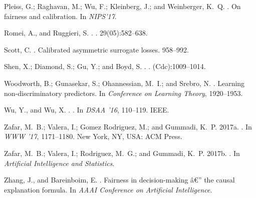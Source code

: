 \documentclass[letterpaper]{article} %
\begin{document}
\begin{thebibliography}{}
Pleiss, G.; Raghavan, M.; Wu, F.; Kleinberg, J.; and Weinberger, K.~Q.
.
\newblock On fairness and calibration.
\newblock In {\em NIPS'17}.

Romei, A., and Ruggieri, S.
.
.
 29(05):582--638.

Scott, C.
.
\newblock Calibrated asymmetric surrogate losses.
  958--992.

Shen, X.; Diamond, S.; Gu, Y.; and Boyd, S.
.
.
\newblock (Cdc):1009--1014.

Woodworth, B.; Gunasekar, S.; Ohannessian, M.~I.; and Srebro, N.
.
\newblock Learning non-discriminatory predictors.
\newblock In {\em Conference on Learning Theory},  1920--1953.

Wu, Y., and Wu, X.
.
.
\newblock In {\em DSAA '16},  110--119.
\newblock IEEE.

Zafar, M.~B.; Valera, I.; {Gomez Rodriguez}, M.; and Gummadi, K.~P.
\newblock 2017a.
.
\newblock In {\em WWW '17},  1171--1180.
\newblock New York, NY, USA: ACM Press.

Zafar, M.~B.; Valera, I.; Rodriguez, M.~G.; and Gummadi, K.~P.
\newblock 2017b.
.
\newblock In {\em Artificial Intelligence and Statistics}.

Zhang, J., and Bareinboim, E.
.
\newblock Fairness in decision-making â€” the causal explanation formula.
\newblock In {\em AAAI Conference on Artificial Intelligence}.


\end{thebibliography}
\end{document}
